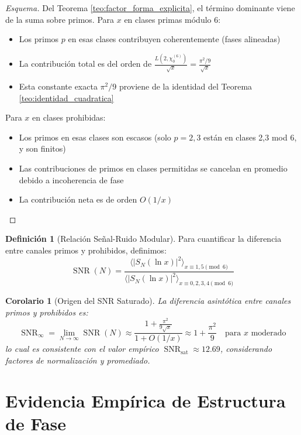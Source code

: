 \documentclass[12pt, a4paper]{article}
\theoremstyle{plain}
\newtheorem{corolario}[teorema]{Corolario}
\theoremstyle{definition}
\newtheorem{definicion}[teorema]{Definición}
\newcommand{\SNR}{\operatorname{SNR}}
\begin{document}
\begin{proof}[Esquema]
Del Teorema \ref{teo:factor_forma_explicita}, el término dominante viene de la suma sobre primos. Para $x$ en clases primas módulo 6:
\begin{itemize}
    \item Los primos $p$ en esas clases contribuyen coherentemente (fases alineadas)
    \item La contribución total es del orden de $\frac{L(2,\chi_0^{(6)})}{\sqrt{x}} = \frac{\pi^2/9}{\sqrt{x}}$
    \item Esta constante exacta $\pi^2/9$ proviene de la identidad del Teorema \ref{teo:identidad_cuadratica}
\end{itemize}

Para $x$ en clases prohibidas:
\begin{itemize}
    \item Los primos en esas clases son escasos (solo $p=2,3$ están en clases 2,3 mod 6, y son finitos)
    \item Las contribuciones de primos en clases permitidas se cancelan en promedio debido a incoherencia de fase
    \item La contribución neta es de orden $O(1/x)$
\end{itemize}
\end{proof}

\begin{definicion}[Relación Señal-Ruido Modular]
Para cuantificar la diferencia entre canales primos y prohibidos, definimos:
\[
\SNR(N) = \frac{\langle |S_N(\ln x)|^2 \rangle_{x \equiv 1,5 \pmod{6}}}{\langle |S_N(\ln x)|^2 \rangle_{x \equiv 0,2,3,4 \pmod{6}}}
\]
\end{definicion}

\begin{corolario}[Origen del SNR Saturado]
La diferencia asintótica entre canales primos y prohibidos es:
\[
\SNR_{\infty} = \lim_{N \to \infty} \SNR(N) \approx \frac{1 + \frac{\pi^2}{9\sqrt{x}}}{1 + O(1/x)} \approx 1 + \frac{\pi^2}{9} \quad \text{para } x \text{ moderado}
\]
lo cual es consistente con el valor empírico $\SNR_{\text{sat}} \approx 12.69$, considerando factores de normalización y promediado.
\end{corolario}

\section{Evidencia Empírica de Estructura de Fase}
\end{document}
